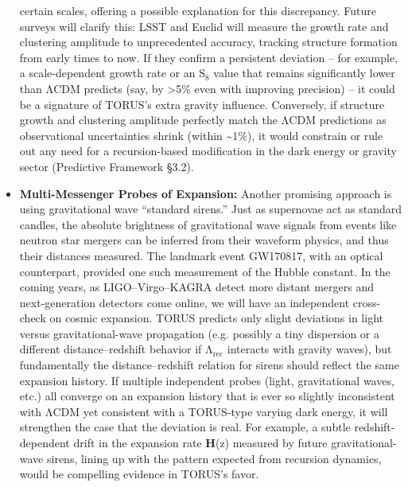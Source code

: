 \documentclass[]{article}
\newcommand{\subscript}[1]{\ensuremath{_{\mathrm{#1}}}}
\begin{document}
\begin{itemize}
  certain scales, offering a possible explanation for this discrepancy.
  Future surveys will clarify this: LSST and Euclid will measure the
  growth rate and clustering amplitude to unprecedented accuracy,
  tracking structure formation from early times to now. If they confirm
  a persistent deviation -- for example, a scale-dependent growth rate
  or an S\subscript{8}
  value that remains significantly lower than ΛCDM predicts (say, by
  \textgreater{}5\% even with improving precision) -- it could be a
  signature of TORUS's extra gravity influence. Conversely, if structure
  growth and clustering amplitude perfectly match the ΛCDM predictions
  as observational uncertainties shrink (within \textasciitilde{}1\%),
  it would constrain or rule out any need for a recursion-based
  modification in the dark energy or gravity sector (Predictive
  Framework §3.2).
\item
  \textbf{Multi-Messenger Probes of Expansion:} Another promising
  approach is using gravitational wave ``standard sirens.'' Just as
  supernovae act as standard candles, the absolute brightness of
  gravitational wave signals from events like neutron star mergers can
  be inferred from their waveform physics, and thus their distances
  measured. The landmark event GW170817, with an optical counterpart,
  provided one such measurement of the Hubble constant. In the coming
  years, as LIGO--Virgo--KAGRA detect more distant mergers and
  next-generation detectors come online, we will have an independent
  cross-check on cosmic expansion. TORUS predicts only slight deviations
  in light versus gravitational-wave propagation (e.g. possibly a tiny
  dispersion or a different distance--redshift behavior if
  Λ\subscript{rec}
  interacts with gravity waves), but fundamentally the
  distance--redshift relation for sirens should reflect the same
  expansion history. If multiple independent probes (light,
  gravitational waves, etc.) all converge on an expansion history that
  is ever so slightly inconsistent with ΛCDM yet consistent with a
  TORUS-type varying dark energy, it will strengthen the case that the
  deviation is real. For example, a subtle redshift-dependent drift in
  the expansion rate \textbf{H}(z) measured by future gravitational-wave
  sirens, lining up with the pattern expected from recursion dynamics,
  would be compelling evidence in TORUS's favor.
\end{itemize}
\end{document}
